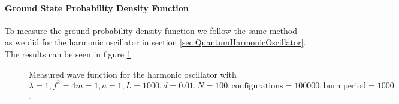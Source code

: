 \documentclass[12pt]{article}
\begin{document}
            \paragraph{Ground State Probability Density Function}
                To measure the ground probability density function we follow the same method as we did for the harmonic oscillator in section \ref{sec:QuantumHarmonicOscillator}. The results can be seen in figure \ref{fig:AnharmonicWaveFunction}
                \begin{figure}
                    \centering
                    \caption{Measured wave function for the harmonic oscillator with $\lambda = 1, f^2=4 m = 1, a = 1, L = 1000, d = 0.01, N = 100, \text{configurations} = 100000, \text{burn period} = 1000$.}
                    \label{fig:AnharmonicWaveFunction}
                \end{figure}
\end{document}
